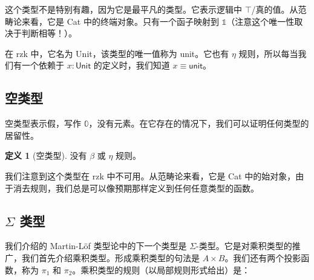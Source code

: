 \documentclass{ctexrep}
\theoremstyle{plain}
\theoremstyle{definition}
\newtheorem{definition}[theorem]{定义}
\theoremstyle{remark}
\theoremstyle{definition}
\theoremstyle{definition}
\theoremstyle{definition}
\begin{document}
这个类型不是特别有趣，因为它是最平凡的类型。它表示逻辑中 $\top$/真的值。从范畴论来看，它是 Cat 中的终端对象。只有一个函子映射到 $\mathbb{1}$（注意这个唯一性取决于判断相等！）。

在 \textsf{rzk} 中，它名为 \textsf{Unit}，该类型的唯一值称为 \textsf{unit}。它也有 $\eta$ 规则，所以每当我们有一个依赖于 $x: \textsf{Unit}$ 的定义时，我们知道 $x \equiv \textsf{unit}$。

\subsection{空类型}

空类型表示假，写作 $\mathbb{0}$，没有元素。在它存在的情况下，我们可以证明任何类型的居留性。
\begin{definition}[空类型]
没有 $\beta$ 或 $\eta$ 规则。
\end{definition}
我们注意到这个类型在 \textsf{rzk} 中不可用。从范畴论来看，它是 Cat 中的始对象，由于消去规则，我们总是可以像预期那样定义到任何任意类型的函数。

\subsection{$\Sigma$ 类型}

我们介绍的 Martin-Löf 类型论中的下一个类型是 $\Sigma$-类型。它是对乘积类型的推广，我们首先介绍乘积类型。形成乘积类型的句法是 $A\times B$。我们还有两个投影函数，称为 $\pi_{1}$ 和 $\pi_{2}$。乘积类型的规则（以局部规则形式给出）是：

\end{document}
